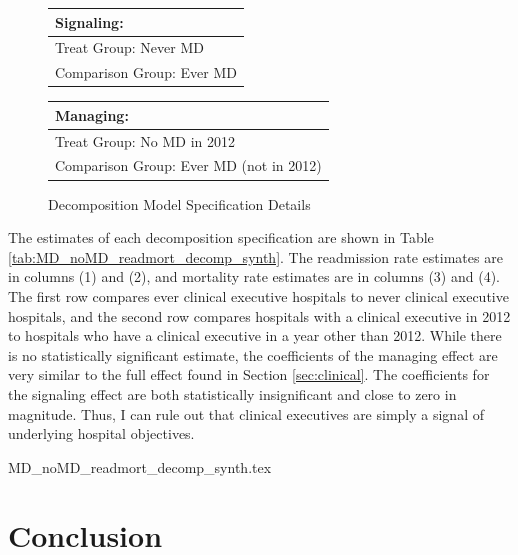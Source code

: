 \documentclass[12pt]{article}
\begin{document}
\begin{figure}[ht!]
\begin{center}
\caption{\label{fig:decomp_spec}Decomposition Model Specification Details}
 
 \begin{tabular}{| m{18em} |}
 \hline
 Signaling:\\ [0.5ex]
 \hline\hline 
 \vspace{2mm}
 Treat Group:  \hspace{15mm} Never MD \\
 \vspace{2mm}
 Comparison Group: \hspace{3mm} Ever MD  \\
 [1ex]
 \hline
 \end{tabular}
\hfil   %
 \begin{tabular}{|m{18em}|}
 \hline
 Managing:\\ [0.5ex]
 \hline\hline
 \vspace{2mm}
 Treat Group: \hspace{11mm} No MD in 2012 \\
 \vspace{2mm}
 Comparison Group:  Ever MD (not in 2012)  \\
 [1ex]
 \hline
 \end{tabular}
 
\end{center}
 \end{figure}


    The estimates of each decomposition specification are shown in Table \ref{tab:MD_noMD_readmort_decomp_synth}. The readmission rate estimates are in columns (1) and (2), and mortality rate estimates are in columns (3) and (4). The first row compares ever clinical executive hospitals to never clinical executive hospitals, and the second row compares hospitals with a clinical executive in 2012 to hospitals who have a clinical executive in a year other than 2012. While there is no statistically significant estimate, the coefficients of the managing effect are very similar to the full effect found in Section \ref{sec:clinical}. The coefficients for the signaling effect are both statistically insignificant and close to zero in magnitude. Thus, I can rule out that clinical executives are simply a signal of underlying hospital objectives. 

    {MD_noMD_readmort_decomp_synth.tex}


    \section{Conclusion}
\end{document}

